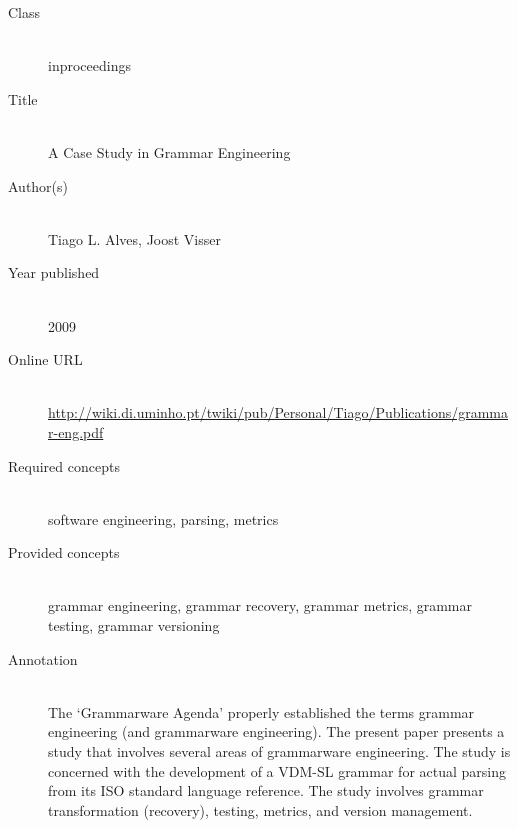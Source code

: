 \begin{description}
\item[Class]\mbox{}\\
inproceedings
\item[Title]\mbox{}\\
A Case Study in Grammar Engineering
\item[Author(s)]\mbox{}\\
Tiago L. Alves, Joost Visser\item[Year published]\mbox{}\\
2009
\item[Online URL]\mbox{}\\
{\footnotesize\url{http://wiki.di.uminho.pt/twiki/pub/Personal/Tiago/Publications/grammar-eng.pdf}}
\item[Required concepts]\mbox{}\\
software engineering, parsing, metrics\item[Provided concepts]\mbox{}\\
grammar engineering, grammar recovery, grammar metrics, grammar testing, grammar versioning\item[Annotation]\mbox{}\\
The `Grammarware Agenda'  properly established the terms grammar engineering (and grammarware engineering). The present paper presents a study that involves several areas of grammarware engineering. The study is concerned with the development of a VDM-SL grammar for actual parsing from its ISO standard language reference. The study involves grammar transformation (recovery), testing, metrics, and version management.
\end{description}


